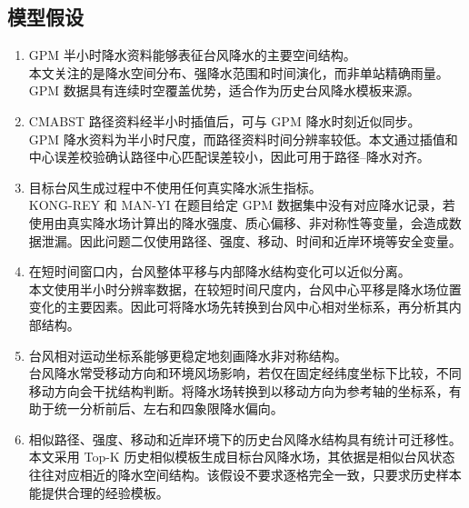 \documentclass[UTF8,a4paper,zihao=5,fontset=fandol]{ctexart}
\numberwithin{equation}{section}
\numberwithin{figure}{section}
\numberwithin{table}{section}
\begin{document}
\subsection{模型假设}
\begin{enumerate}[label={\textbf{假设\arabic*：}}]
  \item GPM 半小时降水资料能够表征台风降水的主要空间结构。\\
  本文关注的是降水空间分布、强降水范围和时间演化，而非单站精确雨量。GPM 数据具有连续时空覆盖优势，适合作为历史台风降水模板来源。
  \item CMABST 路径资料经半小时插值后，可与 GPM 降水时刻近似同步。\\
  GPM 降水资料为半小时尺度，而路径资料时间分辨率较低。本文通过插值和中心误差校验确认路径中心匹配误差较小，因此可用于路径--降水对齐。
  \item 目标台风生成过程中不使用任何真实降水派生指标。\\
  KONG-REY 和 MAN-YI 在题目给定 GPM 数据集中没有对应降水记录，若使用由真实降水场计算出的降水强度、质心偏移、非对称性等变量，会造成数据泄漏。因此问题二仅使用路径、强度、移动、时间和近岸环境等安全变量。
  \item 在短时间窗口内，台风整体平移与内部降水结构变化可以近似分离。\\
  本文使用半小时分辨率数据，在较短时间尺度内，台风中心平移是降水场位置变化的主要因素。因此可将降水场先转换到台风中心相对坐标系，再分析其内部结构。
  \item 台风相对运动坐标系能够更稳定地刻画降水非对称结构。\\
  台风降水常受移动方向和环境风场影响，若仅在固定经纬度坐标下比较，不同移动方向会干扰结构判断。将降水场转换到以移动方向为参考轴的坐标系，有助于统一分析前后、左右和四象限降水偏向。
  \item 相似路径、强度、移动和近岸环境下的历史台风降水结构具有统计可迁移性。\\
  本文采用 Top-K 历史相似模板生成目标台风降水场，其依据是相似台风状态往往对应相近的降水空间结构。该假设不要求逐格完全一致，只要求历史样本能提供合理的经验模板。

\end{enumerate}
\end{document}
